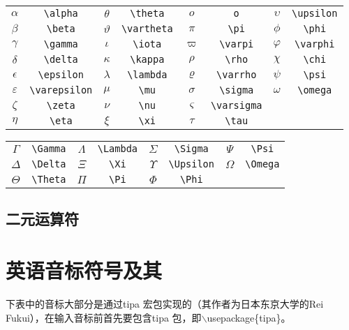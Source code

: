 \begin{table}[H]
\centering
\begin{tabular}{*{8}{c}}
$\alpha$ & \verb|\alpha| & $\theta$ & \verb|\theta| & $o$ & \verb|o| & $\upsilon $& \verb|\upsilon| \\
$\beta$ & \verb|\beta| & $\vartheta$ & \verb|\vartheta| & $\pi$ & \verb|\pi| & $\phi$ & \verb|\phi| \\
$\gamma$ & \verb|\gamma| & $\iota$ & \verb|\iota| & $\varpi $& \verb|\varpi| & $\varphi $& \verb|\varphi| \\
$\delta$ & \verb|\delta| & $\kappa$ & \verb|\kappa| & $\rho $& \verb|\rho| & $\chi $& \verb|\chi| \\
$\epsilon$ & \verb|\epsilon| & $\lambda$ & \verb|\lambda| & $\varrho$ & \verb|\varrho| &$ \psi $& \verb|\psi| \\
$\varepsilon$ & \verb|\varepsilon| & $\mu$ & \verb|\mu| & $\sigma$ & \verb|\sigma| & $\omega$ & \verb|\omega| \\
$\zeta$ & \verb|\zeta| & $\nu$ & \verb|\nu| & $\varsigma$ & \verb|\varsigma| &  &  \\
$\eta$ & \verb|\eta| & $\xi$ & \verb|\xi| & $\tau$ & \verb|\tau| &  &  \\

\end{tabular}
\end{table}

\begin{table}[H]
\centering
\begin{tabular}{*{8}{c}}
$\Gamma $ & \verb|\Gamma| &  $ \Lambda$ & \verb|\Lambda| & $\Sigma $ & \verb|\Sigma| &  $\Psi $ & \verb|\Psi| \\
$\Delta $ & \verb|\Delta| &  $\Xi $ & \verb|\Xi| &  $\Upsilon $ & \verb|\Upsilon| &  $ \Omega$ & \verb|\Omega| \\
$\Theta $ & \verb|\Theta| &  $\Pi $ & \verb|\Pi| &  $ \Phi$ & \verb|\Phi| &  $ $ &  \\
\end{tabular}
\end{table}




\subsection{二元运算符}



\section{英语音标符号及其}
\song\wuhao
下表中的音标大部分是通过tipa 宏包实现的（其作者为日本东京大学的Rei Fukui），在输入音标前首先要包含tipa 包，即$\backslash$usepackage\{tipa\}。

